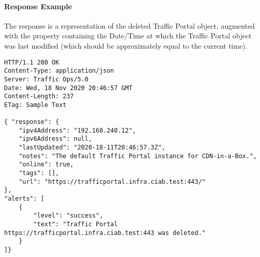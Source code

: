 \paragraph{Response Example}
The response is a representation of the deleted Traffic Portal object, augmented
with the  property containing the Date/Time at which the
Traffic Portal object was last modified (which should be approximately equal to
the current time).

\begin{codelisting}
\begin{verbatim}
HTTP/1.1 200 OK
Content-Type: application/json
Server: Traffic Ops/5.0
Date: Wed, 18 Nov 2020 20:46:57 GMT
Content-Length: 237
ETag: Sample Text

{ "response": {
	"ipv4Address": "192.168.240.12",
	"ipv6Address": null,
	"lastUpdated": "2020-18-11T20:46:57.3Z",
	"notes": "The default Traffic Portal instance for CDN-in-a-Box.",
	"online": true,
	"tags": [],
	"url": "https://trafficportal.infra.ciab.test:443/"
},
"alerts": [
	{
		"level": "success",
		"text": "Traffic Portal https://trafficportal.infra.ciab.test:443 was deleted."
	}
]}
\end{verbatim}
\end{codelisting}
